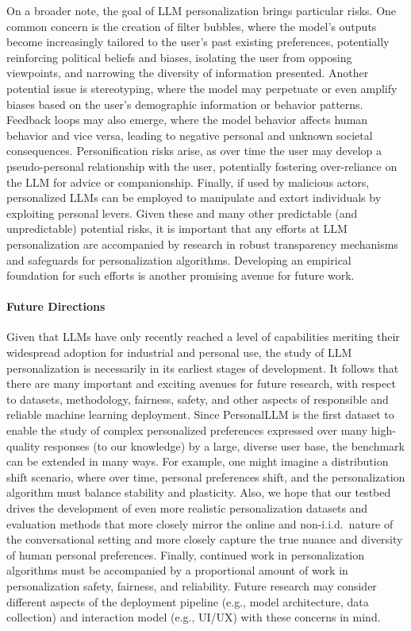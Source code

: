 On a broader note, the goal of LLM personalization brings particular risks.
One common concern is the creation of filter bubbles, where the model's outputs become increasingly tailored to the user's past existing preferences, potentially reinforcing political beliefs and biases, isolating the user from opposing viewpoints, and narrowing the diversity of information presented.
Another potential issue is stereotyping, where the model may perpetuate or even amplify biases based on the user's demographic information or behavior patterns.
Feedback loops may also emerge, where the model behavior affects human behavior and vice versa, leading to negative personal and unknown societal consequences.
Personification risks arise, as over time the user may develop a pseudo-personal relationship with the user, potentially fostering over-reliance on the LLM for advice or companionship. Finally, 
if used by malicious actors, personalized
LLMs can be employed to manipulate and extort
individuals by exploiting personal levers.
Given these and many other predictable (and unpredictable) potential risks, it is important that any efforts at LLM personalization are accompanied by research in robust transparency mechanisms and safeguards for personalization algorithms. Developing an empirical foundation for such efforts is another promising avenue for future work.

\paragraph{Future Directions} Given that LLMs have only recently reached a level of capabilities meriting their widespread adoption for industrial and personal use, the study of LLM personalization is necessarily in its earliest stages of development.  
It follows that there are many important and exciting avenues for future research, with respect to datasets, methodology, fairness, safety, and other aspects of responsible and reliable machine learning deployment.  
Since \textsf{PersonalLLM} is the first dataset to enable the study of complex personalized preferences expressed over many high-quality responses (to our knowledge) by a large, diverse user base, the benchmark can be extended in many ways. 
For example, one might imagine a distribution shift scenario, where over time, personal preferences shift, and the personalization algorithm must balance stability and plasticity.  
Also, we hope that our testbed drives the development of even more realistic personalization datasets and evaluation methods that more closely mirror the online and non-i.i.d.~nature of the conversational setting and more closely capture the true nuance and diversity of human personal preferences.  Finally, continued work in personalization algorithms must be accompanied by a proportional amount of work in personalization safety, fairness, and reliability.  Future research may consider different aspects of the deployment pipeline (e.g., model architecture, data collection) and interaction model (e.g., UI/UX) with these concerns in mind.

